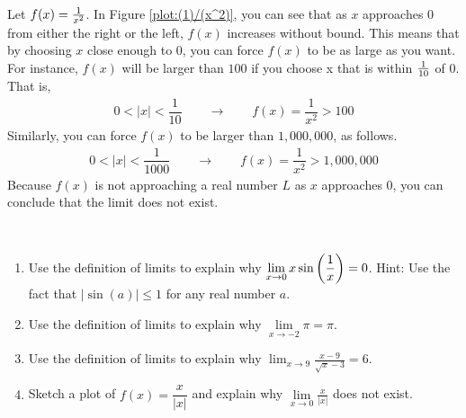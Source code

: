\begin{example}
\begin{solution}
    Let $f(x) = \protect\frac{1}{x^2}$. In Figure \ref{plot:(1)/(x^2)}, you can see that as $x$ approaches 0 from either the right or the left, $f(x)$ increases without bound. This means that by choosing $x$ close enough to $0$, you can force $f(x)$ to be as large as you want. For instance, $f(x)$ will be larger than $100$ if you choose x that is within $1\over 10$ of $0$. That is,
    \begin{align}
        0<|x|<\dfrac{1}{10} \qquad \to \qquad f(x) = \dfrac{1}{x^2} > 100
    \end{align}
    Similarly, you can force $f(x)$ to be larger than $1,000,000$, as follows.
    \begin{align}
        0<|x|<\dfrac{1}{1000} \qquad \to \qquad f(x) = \dfrac{1}{x^2} > 1,000,000
    \end{align}
    Because $f(x)$ is not approaching a real number $L$ as $x$ approaches $0$, you can conclude that the limit does not exist.
    \end{solution}
\end{example}
\begin{exercise}
    ~\\
    \begin{enumerate}
		\item Use the definition of limits to explain why $\displaystyle\lim\limits_{x\to 0 } x\sin\left({1\over x}\right) = 0$.  Hint: Use the fact that $|\sin(a) |\le 1$ for any real number $a$. \cite{mooc}
		\item Use the definition of limits to explain why $\displaystyle\lim\limits_{x\to -2} \pi = \pi$. \cite{mooc}
		\item Use the definition of limits to explain why $\lim_{x\to 9} \frac{x-9}{\sqrt{x}-3}= 6$. \cite{mooc}
        \item Sketch a plot of $f(x) = \dfrac{x}{|x|}$ and explain why $\displaystyle\lim\limits_{x\to 0} \frac{x}{|x|}$ does not exist. \cite{mooc}
    \end{enumerate}

\end{exercise}
